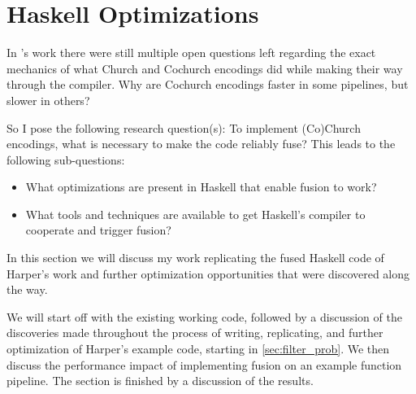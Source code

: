 
\section{Haskell Optimizations}\label{sec:haskell}
In \cite{Harper2011}'s work there were still multiple open questions left regarding the exact mechanics of what Church and Cochurch encodings did while making their way through the compiler. Why are Cochurch encodings faster in some pipelines, but slower in others?

So I pose the following research question(s):
To implement (Co)Church encodings, what is necessary to make the code reliably fuse? This leads to the following sub-questions:
\begin{itemize}[noitemsep]
  \item What optimizations are present in Haskell that enable fusion to work?
  \item What tools and techniques are available to get Haskell's compiler to cooperate and trigger fusion?
\end{itemize}

In this section we will discuss my work replicating the fused Haskell code of Harper's work and further optimization opportunities that were discovered along the way.

We will start off with the existing working code, followed by a discussion of the discoveries made throughout the process of writing, replicating, and further optimization of Harper's example code, starting in \autoref{sec:filter_prob}.
We then discuss the performance impact of implementing fusion on an example function pipeline.
The section is finished by a discussion of the results.

